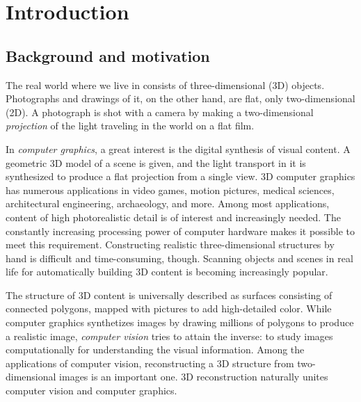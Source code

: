 \section{Introduction}

\thispagestyle{empty}

\subsection{Background and motivation}


The real world where we live in consists of three-dimensional (3D) objects.
Photographs and drawings of it, on the other hand, are flat, only two-dimensional (2D).
A photograph is shot with a camera by making a two-dimensional \emph{projection} of the light traveling in the world on a flat film.


In \emph{computer graphics}, a great interest is the digital synthesis of visual content.
A geometric 3D model of a scene is given, and the light transport in it is synthesized to produce a flat projection from a single view.
3D computer graphics has numerous applications in video games, motion pictures, medical sciences, architectural engineering, archaeology, and more.
Among most applications, content of high photorealistic detail is of interest and increasingly needed.
The constantly increasing processing power of computer hardware makes it possible to meet this requirement.
Constructing realistic three-dimensional structures by hand is difficult and time-consuming, though.
Scanning objects and scenes in real life for automatically building 3D content is becoming increasingly popular.


The structure of 3D content is universally described as surfaces consisting of connected polygons, mapped with pictures to add high-detailed color.
While computer graphics synthetizes images by drawing millions of polygons to produce a realistic image, \emph{computer vision} tries to attain the inverse:
to study images computationally for understanding the visual information.
Among the applications of computer vision, reconstructing a 3D structure from two-dimensional images is an important one.
3D reconstruction naturally unites computer vision and computer graphics.

